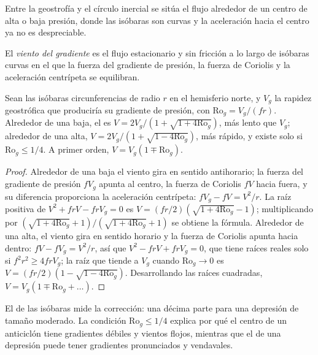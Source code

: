 Entre la geostrofía y el círculo inercial se sitúa el flujo alrededor de un centro de
alta o baja presión, donde las isóbaras son curvas y la aceleración
hacia el centro ya no es despreciable.

\begin{definition}\label{def:b3:gfd-foundations:gradient}
El \emph{viento del gradiente} es el flujo estacionario y sin fricción
a lo largo de isóbaras curvas en el que la fuerza del gradiente de presión, la
fuerza de Coriolis y la aceleración centrípeta se equilibran.
\end{definition}

\begin{proposition}\label{prop:b3:gfd-foundations:gradient}
Sean las isóbaras circunferencias de radio $r$ en el hemisferio norte, y
$V_g$ la rapidez geostrófica que produciría su gradiente de presión, con
$\mathrm{Ro}_g = V_g/(fr)$. Alrededor de una baja, el  es
$V = 2V_g/(1 + \sqrt{1 + 4\mathrm{Ro}_g})$, más lento que $V_g$; alrededor de una
alta, $V = 2V_g/(1 + \sqrt{1 - 4\mathrm{Ro}_g})$, más rápido, y existe solo
si $\mathrm{Ro}_g \le 1/4$. A primer orden, $V = V_g(1 \mp \mathrm{Ro}_g)$.
\end{proposition}

\begin{proof}
Alrededor de una baja el viento gira en sentido antihorario; la fuerza del gradiente de presión
$fV_g$ apunta al centro, la fuerza de Coriolis $fV$ hacia fuera, y su
diferencia proporciona la aceleración centrípeta: $fV_g - fV = V^2/r$. La
raíz positiva de $V^2 + frV - frV_g = 0$ es $V = (fr/2)(\sqrt{1 +
4\mathrm{Ro}_g} - 1)$; multiplicando por $(\sqrt{1 + 4\mathrm{Ro}_g} +
1)/(\sqrt{1 + 4\mathrm{Ro}_g} + 1)$ se obtiene la fórmula. Alrededor de una alta, el
viento gira en sentido horario y la fuerza de Coriolis apunta hacia dentro: $fV - fV_g =
V^2/r$, así que $V^2 - frV + frV_g = 0$, que tiene raíces reales solo si $f^2r^2
\ge 4frV_g$; la raíz que tiende a $V_g$ cuando $\mathrm{Ro}_g \to 0$ es
$V = (fr/2)(1 - \sqrt{1 - 4\mathrm{Ro}_g})$. Desarrollando las raíces cuadradas,
$V = V_g(1 \mp \mathrm{Ro}_g + \dots)$.
\end{proof}

El  de las isóbaras mide la corrección: una décima parte para una
depresión de tamaño moderado. La condición $\mathrm{Ro}_g \le 1/4$ explica por qué
el centro de un anticiclón tiene gradientes débiles y vientos flojos, mientras que
el de una depresión puede tener gradientes pronunciados y vendavales.

